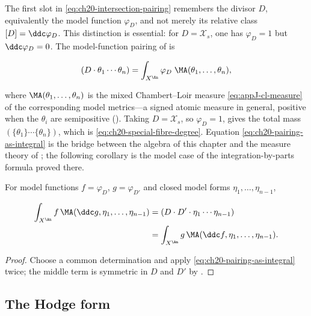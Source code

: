 The first slot in \eqref{eq:ch20-intersection-pairing} remembers the divisor
\(D\), equivalently the model function \(\varphi_D\), and not merely its
relative class \([D]=\ddc\varphi_D\).  This distinction is essential: for
\(D=\mathcal X_s\), one has \(\varphi_D=1\) but
\(\ddc\varphi_D=0\).  The model-function pairing of
 is

\begin{equation}
\label{eq:ch20-pairing-as-integral}
 (D\cdot\theta_1\cdots\theta_n)
 =\int_{X^{\An}}\varphi_D\;\MA(\theta_1,\ldots,\theta_n),
\end{equation}

where \(\MA(\theta_1,\ldots,\theta_n)\) is the mixed Chambert--Loir measure
\eqref{eq:appJ-cl-measure} of the corresponding model metrics---a signed
atomic measure in general, positive when the \(\theta_i\) are semipositive
().  Taking \(D=\mathcal X_s\), so
\(\varphi_D=1\), gives the total mass
\((\{\theta_1\}\cdots\{\theta_n\})\), which is
\eqref{eq:ch20-special-fibre-degree}.  Equation
\eqref{eq:ch20-pairing-as-integral} is the bridge between the algebra of this
chapter and the measure theory of ; the following
corollary is the model case of the integration-by-parts formula
 proved there.

\begin{corollary}
\label{cor:ch20-integration-by-parts}
For model functions \(f=\varphi_D\), \(g=\varphi_{D'}\) and closed model
forms \(\eta_1,\ldots,\eta_{n-1}\),

\begin{equation}
\label{eq:ch20-ibp}
\begin{aligned}
 \int_{X^{\An}}f\,\MA(\ddc g,\eta_1,\ldots,\eta_{n-1})
 &=(D\cdot D'\cdot\eta_1\cdots\eta_{n-1})\\
 &=\int_{X^{\An}}g\,\MA(\ddc f,\eta_1,\ldots,\eta_{n-1}).
\end{aligned}
\end{equation}
\end{corollary}

\begin{proof}
Choose a common determination and apply
\eqref{eq:ch20-pairing-as-integral} twice; the middle term is symmetric in
\(D\) and \(D'\) by .
\end{proof}

\subsection{The Hodge form}
\label{sec:ch20-hodge}

